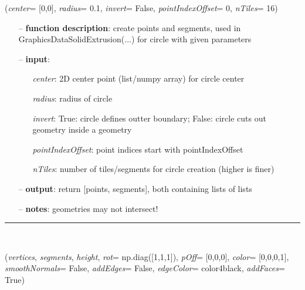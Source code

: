 \begin{itemize}[leftmargin=1.4cm]
\begin{itemize}[leftmargin=1.4cm]
\begin{itemize}[leftmargin=1.4cm]
\begin{itemize}[leftmargin=0.5cm]
\begin{itemize}[leftmargin=1.4cm]
\begin{itemize}[leftmargin=1.4cm]
\begin{itemize}[leftmargin=0.5cm]
\begin{itemize}[leftmargin=1.4cm]
\begin{itemize}[leftmargin=0.5cm]
\begin{flushleft}
\label{sec:graphicsDataUtilities:CirclePointsAndSegments}
({\it center}= [0,0], {\it radius}= 0.1, {\it invert}= False, {\it pointIndexOffset}= 0, {\it nTiles}= 16)
\end{flushleft}
\setlength{\itemindent}{0.7cm}
\begin{itemize}[leftmargin=0.7cm]
\item[--]
{\bf function description}: create points and segments, used in GraphicsDataSolidExtrusion(...) for circle with given parameters
\item[--]
{\bf input}: \vspace{-6pt}
\begin{itemize}[leftmargin=1.2cm]
\setlength{\itemindent}{-0.7cm}
\item[]{\it center}: 2D center point (list/numpy array) for circle center
\item[]{\it radius}: radius of circle
\item[]{\it invert}: True: circle defines outter boundary; False: circle cuts out geometry inside a geometry
\item[]{\it pointIndexOffset}: point indices start with pointIndexOffset
\item[]{\it nTiles}: number of tiles/segments for circle creation (higher is finer)
\end{itemize}
\item[--]
{\bf output}: return [points, segments], both containing lists of lists
\item[--]
{\bf notes}: geometries may not intersect!
\vspace{12pt}\end{itemize}
%
\noindent\rule{8cm}{0.75pt}\vspace{1pt} \\ 
\begin{flushleft}
\label{sec:graphicsDataUtilities:GraphicsDataSolidExtrusion}
({\it vertices}, {\it segments}, {\it height}, {\it rot}= np.diag([1,1,1]), {\it pOff}= [0,0,0], {\it color}= [0,0,0,1], {\it smoothNormals}= False, {\it addEdges}= False, {\it edgeColor}= color4black, {\it addFaces}= True)
\end{flushleft}
\setlength{\itemindent}{0.7cm}

\end{itemize}
\end{itemize}
\end{itemize}
\end{itemize}
\end{itemize}
\end{itemize}
\end{itemize}
\end{itemize}
\end{itemize}

